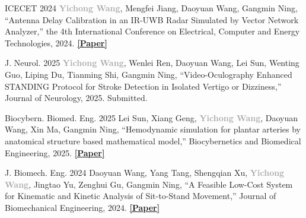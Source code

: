
\begin{publications}
  \publication
  {ICECET 2024}
  {\textbf{\textcolor{darkgray}{Yichong Wang}}, Mengfei Jiang, Daoyuan Wang,
  Gangmin Ning, ``Antenna Delay Calibration in an IR-UWB Radar Simulated by
  Vector Network Analyzer,'' the 4th International Conference on Electrical,
  Computer and Energy Technologies, 2024.
  \textbf{\textcolor{Mycolor2}{\href{https://ieeexplore.ieee.org/document/10698730/}{[Paper]}}}}
\end{publications}


\begin{publications}
  \publication
  {J. Neurol. 2025}
  {\textbf{\textcolor{darkgray}{Yichong Wang}}, Wenlei Ren, Daoyuan Wang,
  Lei Sun, Wenting Guo, Liping Du, Tianming Shi, Gangmin Ning,
  ``Video-Oculography Enhanced STANDING Protocol for Stroke Detection in
  Isolated Vertigo or Dizziness,'' Journal of Neurology, 2025. Submitted.}
\end{publications}

\begin{publications}
  \publication
  {Biocybern. Biomed. Eng. 2025}
  {Lei Sun, Xiang Geng, \textbf{\textcolor{darkgray}{Yichong Wang}},
  Daoyuan Wang, Xin Ma, Gangmin Ning, ``Hemodynamic simulation for plantar
  arteries by anatomical structure based mathematical model,'' Biocybernetics
  and Biomedical Engineering, 2025.
  \textbf{\textcolor{Mycolor2}{\href{https://doi.org/10.1016/j.bbe.2025.05.006}{[Paper]}}}}
\end{publications}

\begin{publications}
  \publication
  {J. Biomech. Eng. 2024}
  {Daoyuan Wang, Yang Tang, Shengqian Xu,
  \textbf{\textcolor{darkgray}{Yichong Wang}}, Jingtao Yu, Zenghui Gu,
  Gangmin Ning, ``A Feasible Low-Cost System for Kinematic and Kinetic
  Analysis of Sit-to-Stand Movement,'' Journal of Biomechanical Engineering,
  2024.
  \textbf{\textcolor{Mycolor2}{\href{https://doi.org/10.1115/1.4067981}{[Paper]}}}}
\end{publications}
